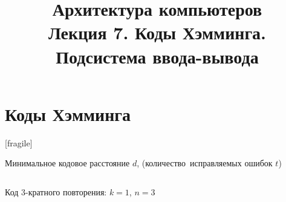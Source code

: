 \newcommand{\h}{handout,
}



\title[Коды Хэмминга. Подсистема I/O]{Архитектура компьютеров\texorpdfstring{\\}{ }Лекция 7. Коды Хэмминга.\texorpdfstring{\\}{ }Подсистема ввода-вывода}



\begin{frame}
\titlepage
\end{frame}

\section{Коды Хэмминга}[fragile]

\begin{frame}{Минимальное кодовое расстояние $d$,
(количество~исправляемых ошибок $t$)}

\begin{columns}
    \column{5.5cm}
\begin{block}{Код 3-кратного повторения: $k=1$, $n=3$}
\end{block}

    \column{5.5cm}
\end{columns}
\end{frame}

